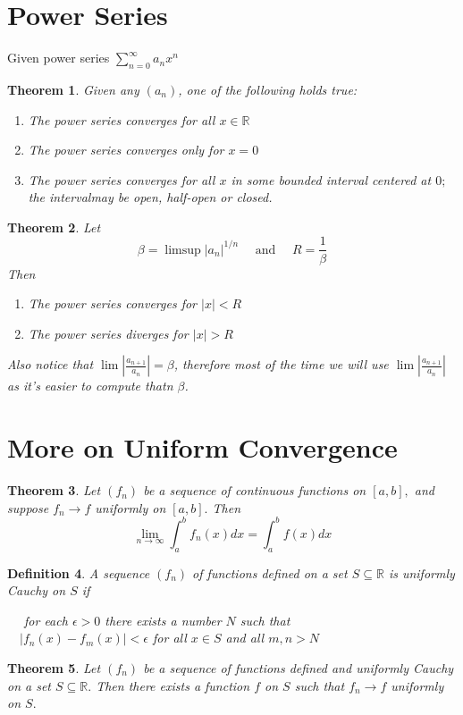 \documentclass[12pt]{article}
\newtheorem{theorem}{Theorem}[section]
\newtheorem{definition}[theorem]{Definition}
\begin{document}
\section{Power Series}
Given power series $\sum _ { n = 0 } ^ { \infty } a _ { n } x ^ { n }$
\begin{theorem}
Given any $(a_n)$, one of the following holds true:
\begin{enumerate}
	\item The power series converges for all $x \in \mathbb{R}$
	\item The power series converges only for $x = 0$
	\item The power series converges for all $x$ in some bounded interval centered at $0 ;$ the intervalmay be open, half-open or closed.
\end{enumerate}
\end{theorem}

\begin{theorem}
	Let $$
	\beta = \limsup \left| a _ { n } \right| ^ { 1 / n } \quad \text { and } \quad R = \frac { 1 } { \beta }
	$$
	Then
	\begin{enumerate}
		\item The power series converges for  $|x| < R$
		\item The power series diverges for $|x| > R$
	\end{enumerate}
	
	Also notice that $\lim \left| \frac { a _ { n + 1 } } { a _ { n } } \right| = \beta$, therefore most of the time we will use $\lim \left| \frac { a _ { n + 1 } } { a _ { n } } \right|$ as it's easier to compute thatn $\beta$.
\end{theorem}
\section{More on Uniform Convergence}
\begin{theorem}
	Let $\left( f _ { n } \right)$ be a sequence of continuous functions on $[ a , b ] ,$ and suppose
	$f _ { n } \rightarrow f$ uniformly on $[ a , b ] .$ Then
	$$\lim _ { n \rightarrow \infty } \int _ { a } ^ { b } f _ { n } ( x ) d x = \int _ { a } ^ { b } f ( x ) d x$$
\end{theorem}
\begin{definition}
	A sequence $\left( f _ { n } \right)$ of functions defined on a set $S \subseteq \mathbb { R }$ is uniformly
	Cauchy on $S$ if
	\begin{center}
			$\quad$ for each $\epsilon > 0$ there exists a number $N$ such that\\
		$\quad \left| f _ { n } ( x ) - f _ { m } ( x ) \right| < \epsilon$ for all $x \in S$ and all $m , n > N$
	\end{center}

\end{definition}
\begin{theorem}
	Let $\left( f _ { n } \right)$ be a sequence of functions defined and uniformly Cauchy on
	a set $S \subseteq \mathbb { R } .$ Then there exists a function $f$ on $S$ such that $f _ { n } \rightarrow f$
	uniformly on $S .$
\end{theorem}
\end{document}
